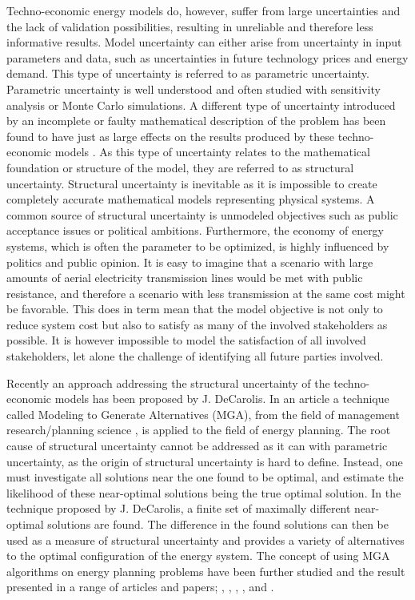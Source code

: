 Techno-economic energy models do, however, suffer from large uncertainties and the lack of validation possibilities, resulting in unreliable and therefore less informative results.
Model uncertainty can either arise from uncertainty in input parameters and data, such as uncertainties in future technology prices and energy demand. This type of uncertainty is referred to as parametric uncertainty. Parametric uncertainty is well understood and often studied with sensitivity analysis or Monte Carlo simulations. 
A different type of uncertainty introduced by an incomplete or faulty mathematical description of the problem has been found to have just as large effects on the results produced by these techno-economic models \cite{DeCarolis_MGA}. As this type of uncertainty relates to the mathematical foundation or structure of the model, they are referred to as structural uncertainty. 
Structural uncertainty is inevitable as it is impossible to create completely accurate mathematical models representing physical systems. A common source of structural uncertainty is unmodeled objectives such as public acceptance issues or political ambitions. Furthermore, the economy of energy systems, which is often the parameter to be optimized, is highly influenced by politics and public opinion. It is easy to imagine that a scenario with large amounts of aerial electricity transmission lines would be met with public resistance, and therefore a scenario with less transmission at the same cost might be favorable. 
This does in term mean that the model objective is not only to reduce system cost but also to satisfy as many of the involved stakeholders as possible. It is however impossible to model the satisfaction of all involved stakeholders, let alone the challenge of identifying all future parties involved.  


Recently an approach addressing the structural uncertainty of the techno-economic models has been proposed by J. DeCarolis. In an article \cite{DeCarolis_MGA} a technique called Modeling to Generate Alternatives (MGA), from the field of management research/planning science \cite{Brill_MGA_1982}, is applied to the field of energy planning. The root cause of structural uncertainty cannot be addressed as it can with parametric uncertainty, as the origin of structural uncertainty is hard to define. Instead, one must investigate all solutions near the one found to be optimal, and estimate the likelihood of these near-optimal solutions being the true optimal solution. In the technique proposed by J. DeCarolis, a finite set of maximally different near-optimal solutions are found. The difference in the found solutions can then be used as a measure of structural uncertainty and provides a variety of alternatives to the optimal configuration of the energy system. The concept of using MGA algorithms on energy planning problems have been further studied and the result presented in a range of articles and papers; \cite{DeCarolis_MGA}, \cite{DECAROLIS2016}, \cite{MGA_Price}, \cite{BERNTSEN2017886}, \cite{Optimum_not_enough} and \cite{Fabian_MGA}.

